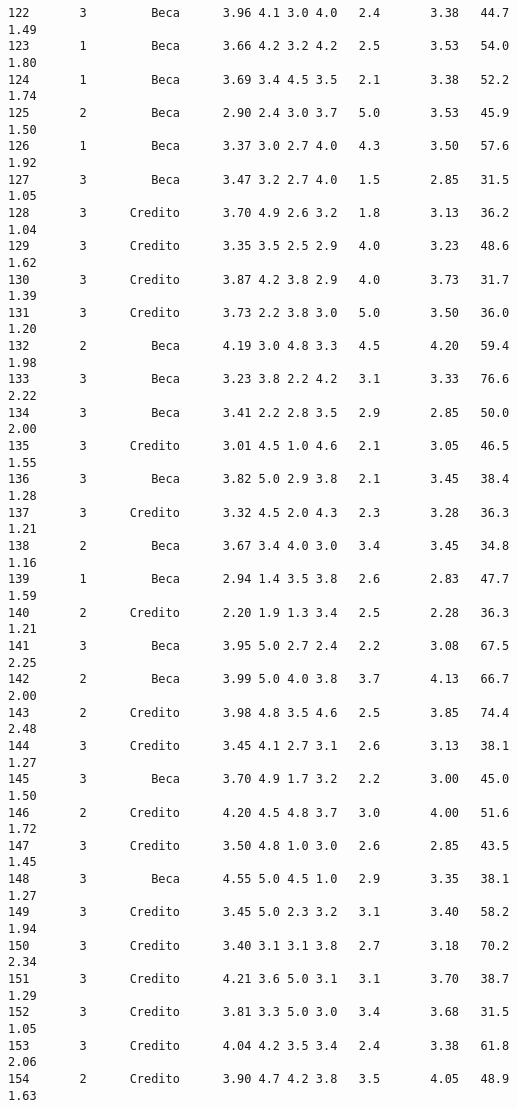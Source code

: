 \documentclass[
  letterpaper,
  DIV=11,
  numbers=noendperiod]{scrartcl}
\begin{document}
\begin{verbatim}
122       3         Beca      3.96 4.1 3.0 4.0   2.4       3.38   44.7    1.49
123       1         Beca      3.66 4.2 3.2 4.2   2.5       3.53   54.0    1.80
124       1         Beca      3.69 3.4 4.5 3.5   2.1       3.38   52.2    1.74
125       2         Beca      2.90 2.4 3.0 3.7   5.0       3.53   45.9    1.50
126       1         Beca      3.37 3.0 2.7 4.0   4.3       3.50   57.6    1.92
127       3         Beca      3.47 3.2 2.7 4.0   1.5       2.85   31.5    1.05
128       3      Credito      3.70 4.9 2.6 3.2   1.8       3.13   36.2    1.04
129       3      Credito      3.35 3.5 2.5 2.9   4.0       3.23   48.6    1.62
130       3      Credito      3.87 4.2 3.8 2.9   4.0       3.73   31.7    1.39
131       3      Credito      3.73 2.2 3.8 3.0   5.0       3.50   36.0    1.20
132       2         Beca      4.19 3.0 4.8 3.3   4.5       4.20   59.4    1.98
133       3         Beca      3.23 3.8 2.2 4.2   3.1       3.33   76.6    2.22
134       3         Beca      3.41 2.2 2.8 3.5   2.9       2.85   50.0    2.00
135       3      Credito      3.01 4.5 1.0 4.6   2.1       3.05   46.5    1.55
136       3         Beca      3.82 5.0 2.9 3.8   2.1       3.45   38.4    1.28
137       3      Credito      3.32 4.5 2.0 4.3   2.3       3.28   36.3    1.21
138       2         Beca      3.67 3.4 4.0 3.0   3.4       3.45   34.8    1.16
139       1         Beca      2.94 1.4 3.5 3.8   2.6       2.83   47.7    1.59
140       2      Credito      2.20 1.9 1.3 3.4   2.5       2.28   36.3    1.21
141       3         Beca      3.95 5.0 2.7 2.4   2.2       3.08   67.5    2.25
142       2         Beca      3.99 5.0 4.0 3.8   3.7       4.13   66.7    2.00
143       2      Credito      3.98 4.8 3.5 4.6   2.5       3.85   74.4    2.48
144       3      Credito      3.45 4.1 2.7 3.1   2.6       3.13   38.1    1.27
145       3         Beca      3.70 4.9 1.7 3.2   2.2       3.00   45.0    1.50
146       2      Credito      4.20 4.5 4.8 3.7   3.0       4.00   51.6    1.72
147       3      Credito      3.50 4.8 1.0 3.0   2.6       2.85   43.5    1.45
148       3         Beca      4.55 5.0 4.5 1.0   2.9       3.35   38.1    1.27
149       3      Credito      3.45 5.0 2.3 3.2   3.1       3.40   58.2    1.94
150       3      Credito      3.40 3.1 3.1 3.8   2.7       3.18   70.2    2.34
151       3      Credito      4.21 3.6 5.0 3.1   3.1       3.70   38.7    1.29
152       3      Credito      3.81 3.3 5.0 3.0   3.4       3.68   31.5    1.05
153       3      Credito      4.04 4.2 3.5 3.4   2.4       3.38   61.8    2.06
154       2      Credito      3.90 4.7 4.2 3.8   3.5       4.05   48.9    1.63

\end{verbatim}
\end{document}
